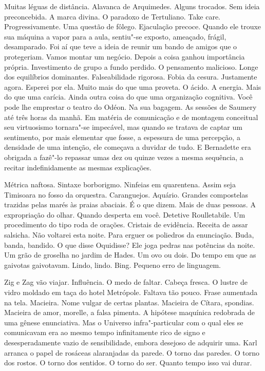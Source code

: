 Muitas léguas de distância. Alavanca de Arquimedes. Alguns trocados. Sem
ideia preconcebida. A marca divina. O paradoxo de Tertuliano. Take care.
Progressivamente. Uma questão de fôlego. Ejaculação precoce. Quando ele
trouxe sua máquina a vapor para a aula, sentiu"-se exposto, ameaçado,
frágil, desamparado. Foi aí que teve a ideia de reunir um bando de
amigos que o protegeriam. Vamos montar um negócio. Depois a coisa ganhou
importância própria. Investimento de grupo a fundo perdido. O pensamento
malicioso. Longe dos equilíbrios dominantes. Falseabilidade rigorosa.
Fobia da cesura. Justamente agora. Esperei por ela. Muito mais do que
uma proveta. O ácido. A energia. Mais do que uma carícia. Ainda outra
coisa do que uma organização cognitiva. Você pode lhe emprestar o teatro
do Odéon. Na sua bagagem. As sessões de Saumery até três horas da manhã.
Em matéria de comunicação e de montagem conceitual seu virtuosismo
tornara"-se impecável, mas quando se tratava de captar um sentimento, por
mais elementar que fosse, a espessura de uma percepção, a densidade de
uma intenção, ele começava a duvidar de tudo. E Bernadette era obrigada
a fazê"-lo repassar umas dez ou quinze vezes a mesma sequência, a recitar
indefinidamente as mesmas explicações.

Métrica naftosa. Sintaxe borborigmo. Ninfeias em quarentena. Assim seja
Timisoara no fosso da orquestra. Caranguejos. Aquário. Grandes
compostelas trazidas pelas marés às praias abaciais. É o que dizem. Mais
de duas pessoas. A expropriação do olhar. Quando desperta em você.
Detetive Roulletabile. Um procedimento do tipo roda de orações. Cristais
de evidência. Receita de assar salsicha. Não voltarei esta noite. Para
erguer os poliedros da enunciação. Buda, banda, bandido. O que disse
Oquidisse? Ele joga pedras nas potências da noite. Um grão de groselha
no jardim de Hades. Um ovo ou dois. Do tempo em que as gaivotas
gaivotavam. Lindo, lindo. Bing. Pequeno erro de linguagem.

Zig e Zag vão viajar. Influência. O medo de faltar. Cabeça fresca. O
lustre de vidro moldado em taça do hotel Metrópole. Faltava tão pouco.
Frase aumentada na tela. Macieira. Nome vulgar de certas plantas.
Macieira de Cítara, spondias. Macieira de amor, morelle, a falsa
pimenta. A hipótese maquínica redobrada de uma gênese enunciativa. Mas o
Universo infra"-particular com o qual eles se comunicavam era ao mesmo
tempo infinitamente rico de signo e desesperadamente vazio de
sensibilidade, embora desejoso de adquirir uma. Karl arranca o papel de
rosáceas alaranjadas da parede. O torno das paredes. O torno dos rostos.
O torno dos sentidos. O torno do ser. Quanto tempo isso vai durar.

